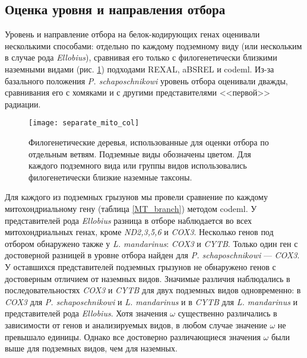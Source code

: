 \subsection{Оценка уровня и направления отбора}

Уровень и направление отбора на белок-кодирующих генах оценивали несколькими способами: отдельно по каждому подземному виду (или нескольким в случае рода \textit{Ellobius}), сравнивая его только с филогенетически близкими наземными видами (рис. \ref{tree_mito}) подходами REXAL, aBSREL и codeml. Из-за базального положения \textit{P. schaposchnikowi} уровень отбора оценивали дважды, сравнивания его с хомяками и с другими представителями <<первой>> радиации.   

\begin{figure}[h!]
	\begin{center}
		\texttt{[image: separate\_mito\_col]}
	\end{center}
	\caption{Филогенетические деревья, использованные для оценки отбора по отдельным ветвям. Подземные виды обозначены цветом. Для каждого подземного вида или группы видов использовались филогенетически близкие наземные таксоны.}
	\label{tree_mito}
\end{figure}


Для каждого из подземных грызунов мы провели сравнение по каждому митохондриальному гену (таблица \ref{MT_branch}) методом codeml. У представителей рода \textit{Ellobius} разница в отборе наблюдается во всех митохондриальных генах, кроме \textit{ND2,3,5,6} и \textit{COX3}. Несколько генов под отбором обнаружено также у \textit{L. mandarinus}: \textit{COX3} и \textit{CYTB}. Только один ген с достоверной разницей в уровне отбора найден для \textit{P. schaposchnikowi} --- \textit{COX3}. У оставшихся представителей подземных грызунов не обнаружено генов с достоверным отличием от наземных видов. Значимые различия наблюдались в последовательностях \textit{COX3} и \textit{CYTB} для двух подземных видов одновременно: в \textit{COX3} для \textit{P. schaposchnikowi} и \textit{L. mandarinus} и в \textit{CYTB} для \textit{L. mandarinus} и представителей рода \textit{Ellobius}. 
Хотя значения $\omega$ существенно различались в зависимости от генов и анализируемых видов, в любом случае значение $\omega$ не превышало единицы. Однако все достоверно различающиеся значения $\omega$ были выше для подземных видов, чем для наземных. 

